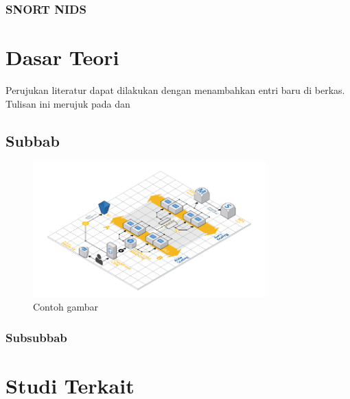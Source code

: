     \subsubsection{SNORT NIDS}

\section{Dasar Teori}
Perujukan literatur dapat dilakukan dengan menambahkan entri baru di berkas. Tulisan ini merujuk pada \parencite{parker1998} dan \parencite{4026885}

  \subsection{Subbab}

  \blindtext

  \begin{figure}[h]
    \centering
    \includegraphics[width=0.8\textwidth]{resources/chapter-2-infrastructure-diagram.png}
    \caption{Contoh gambar}
  \end{figure}

  \subsubsection{Subsubbab}

  \blindtext

\section{Studi Terkait}
\blindtext
